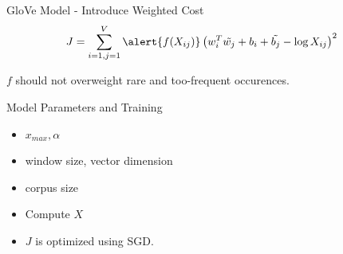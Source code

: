\begin{frame}{GloVe Model - Introduce Weighted Cost}
  \begin{align*}
    & J = \sum_{i=1,j=1}^V \alert{f(X_{ij})} \left( w_i^T\tilde{w_j} +b_i + \tilde{b_j} - \log X_{ij} \right)^2
  \end{align*}
  \begin{center}
      $f$ should not overweight rare and too-frequent occurences.
  \end{center}
\end{frame}

\begin{frame}{Model Parameters and Training}
  \begin{itemize}
  \item $x_{max},\alpha$
  \item window size, vector dimension
  \item corpus size
  \end{itemize}
  \begin{itemize}[<+->]
  \item Compute $X$
  \item $J$ is optimized using SGD.
  \end{itemize}
\end{frame}


